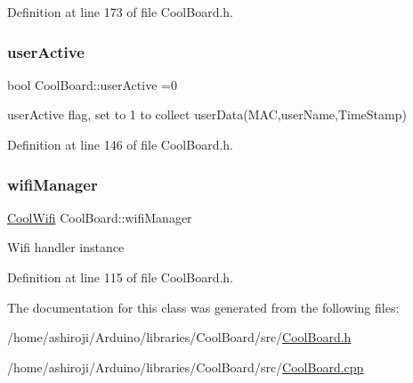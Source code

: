 Definition at line 173 of file Cool\+Board.\+h.

\mbox{\label{class_cool_board_a6395459131d6889a3005f79c7a35e964}} 
\subsubsection{\texorpdfstring{user\+Active}{userActive}}
{\footnotesize\ttfamily bool Cool\+Board\+::user\+Active =0\hspace{0.3cm}{\ttfamily [private]}}

user\+Active flag, set to 1 to collect user\+Data(\+M\+A\+C,user\+Name,\+Time\+Stamp) 

Definition at line 146 of file Cool\+Board.\+h.

\mbox{\label{class_cool_board_acd88e6003606b47479ebba81e4aceeca}} 
\subsubsection{\texorpdfstring{wifi\+Manager}{wifiManager}}
{\footnotesize\ttfamily \hyperlink{class_cool_wifi}{Cool\+Wifi} Cool\+Board\+::wifi\+Manager\hspace{0.3cm}{\ttfamily [private]}}

Wifi handler instance 

Definition at line 115 of file Cool\+Board.\+h.



The documentation for this class was generated from the following files\+:\begin{DoxyCompactItemize}
\item 
/home/ashiroji/\+Arduino/libraries/\+Cool\+Board/src/\hyperlink{_cool_board_8h}{Cool\+Board.\+h}\item 
/home/ashiroji/\+Arduino/libraries/\+Cool\+Board/src/\hyperlink{_cool_board_8cpp}{Cool\+Board.\+cpp}\end{DoxyCompactItemize}
